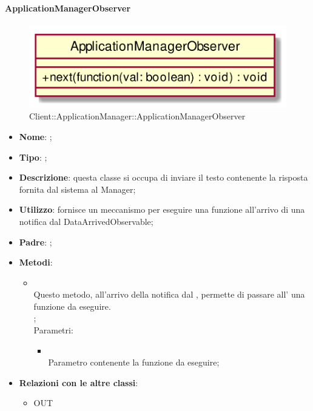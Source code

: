 \hypertarget{ApplicationManagerObserver_label}{\paragraph{ApplicationManagerObserver}}
\begin{figure}[h]
	\centering
	\includegraphics[width=\textwidth,height=\textheight,keepaspectratio]{images/ClassApplicationManagerObserver.png}
	\caption{Client::ApplicationManager::ApplicationManagerObserver}
\end{figure}
\begin{itemize}
	\item \textbf{Nome}: ;
	\item \textbf{Tipo}: ;
	\item \textbf{Descrizione}: questa classe si occupa di inviare il testo contenente la risposta fornita dal sistema al Manager;
	\item \textbf{Utilizzo}: fornisce un meccanismo per eseguire una funzione all'arrivo di una notifica dal DataArrivedObservable;
	\item \textbf{Padre}: ;
	\item \textbf{Metodi}:
	\begin{itemize}
		\item[]  \\
		Questo metodo, all'arrivo della notifica dal , permette di passare all' una funzione da eseguire. \\
;\\
		Parametri:
		\begin{itemize}
			\item {} \\
			Parametro contenente la funzione da eseguire;
		\end{itemize}
	\end{itemize}
	\item \textbf{Relazioni con le altre classi}:
	\begin{itemize}
		\item OUT \hyperlink{DataArrivedObservable_label}{}
	\end{itemize}
\end{itemize}


